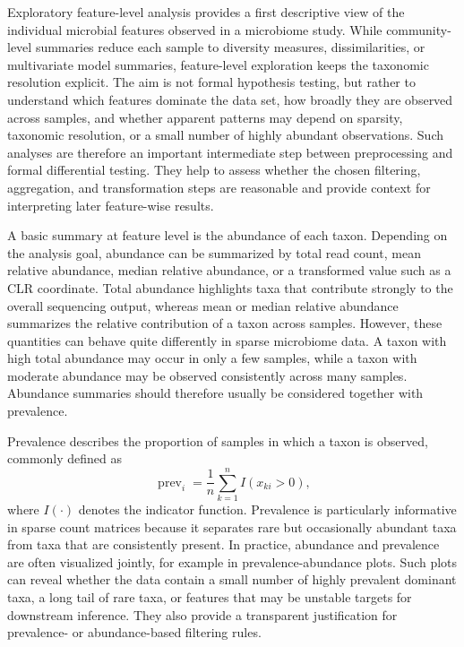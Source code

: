 Exploratory feature-level analysis provides a first descriptive view of the individual microbial features observed in a microbiome study. While community-level summaries reduce each sample to diversity measures, dissimilarities, or multivariate model summaries, feature-level exploration keeps the taxonomic resolution explicit. The aim is not formal hypothesis testing, but rather to understand which features dominate the data set, how broadly they are observed across samples, and whether apparent patterns may depend on sparsity, taxonomic resolution, or a small number of highly abundant observations. Such analyses are therefore an important intermediate step between preprocessing and formal differential testing. They help to assess whether the chosen filtering, aggregation, and transformation steps are reasonable and provide context for interpreting later feature-wise results.

A basic summary at feature level is the abundance of each taxon. Depending on the analysis goal, abundance can be summarized by total read count, mean relative abundance, median relative abundance, or a transformed value such as a CLR coordinate. Total abundance highlights taxa that contribute strongly to the overall sequencing output, whereas mean or median relative abundance summarizes the relative contribution of a taxon across samples. However, these quantities can behave quite differently in sparse microbiome data. A taxon with high total abundance may occur in only a few samples, while a taxon with moderate abundance may be observed consistently across many samples. Abundance summaries should therefore usually be considered together with prevalence.

Prevalence describes the proportion of samples in which a taxon is observed, commonly defined as
\begin{equation}
\operatorname{prev}_i = \frac{1}{n}\sum_{k=1}^n I(x_{ki} > 0),
\end{equation}
where $I(\cdot)$ denotes the indicator function. Prevalence is particularly informative in sparse count matrices because it separates rare but occasionally abundant taxa from taxa that are consistently present. In practice, abundance and prevalence are often visualized jointly, for example in prevalence-abundance plots. Such plots can reveal whether the data contain a small number of highly prevalent dominant taxa, a long tail of rare taxa, or features that may be unstable targets for downstream inference. They also provide a transparent justification for prevalence- or abundance-based filtering rules.

